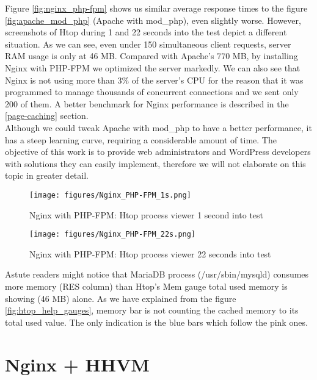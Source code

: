 Figure \ref{fig:nginx_php-fpm} shows us similar average response times to the figure \ref{fig:apache_mod_php} (Apache with mod\_php), even slightly worse. However, screenshots of Htop during 1 and 22 seconds into the test depict a different situation. As we can see, even under 150 simultaneous client requests, server RAM usage is only at 46 MB. Compared with Apache's 770 MB, by installing Nginx with PHP-FPM we optimized the server markedly. We can also see that Nginx is not using more than 3\% of the server's CPU for the reason that it was programmed to manage thousands of concurrent connections and we sent only 200 of them. A better benchmark for Nginx performance is described in the \ref{page-caching} section. \\

Although we could tweak Apache with mod\_php to have a better performance, it has a steep learning curve, requiring a considerable amount of time. The objective of this work is to provide web administrators and WordPress developers with solutions they can easily implement, therefore we will not elaborate on this topic in greater detail. 

\begin{figure}[H]
\begin{center}
\texttt{[image: figures/Nginx\_PHP-FPM\_1s.png]}
\caption{Nginx with PHP-FPM: Htop process viewer 1 second into test}
\label{fig:nginx_php-fpm_1s}
\end{center}
\end{figure}

\begin{figure}[H]
\begin{center}
\texttt{[image: figures/Nginx\_PHP-FPM\_22s.png]}
\caption{Nginx with PHP-FPM: Htop process viewer 22 seconds into test}
\label{fig:nginx_php-fpm_22s}
\end{center}
\end{figure}

Astute readers might notice that MariaDB process (/usr/sbin/mysqld) consumes more memory (RES column) than Htop's Mem gauge total used memory is showing (46 MB) alone. As we have explained from the figure \ref{fig:htop_help_gauges}, memory bar is not counting the cached memory to its total used value. The only indication is the blue bars which follow the pink ones.

\section{Nginx + HHVM}

